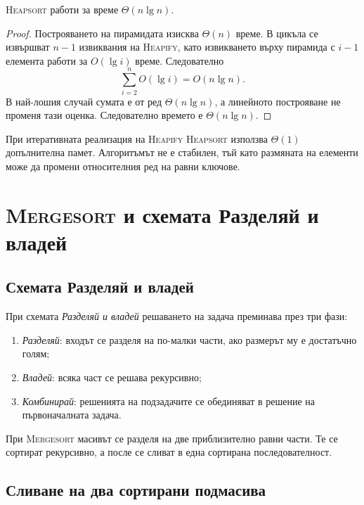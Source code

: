 \begin{thm}
\textsc{Heapsort} работи за време $\Theta(n\lg n)$.
\end{thm}

\begin{proof}
Построяването на пирамидата изисква $\Theta(n)$ време. В цикъла се извършват $n-1$ извиквания на \textsc{Heapify}, като извикването върху пирамида с $i-1$ елемента работи за $O(\lg i)$ време. Следователно
\[
\sum_{i=2}^{n} O(\lg i)=O(n\lg n).
\]
В най-лошия случай сумата е от ред $\Theta(n\lg n)$, а линейното построяване не променя тази оценка. Следователно времето е $\Theta(n\lg n)$.
\end{proof}

\begin{remark}
При итеративната реализация на \textsc{Heapify} \textsc{Heapsort} използва $\Theta(1)$ допълнителна памет. Алгоритъмът не е стабилен, тъй като размяната на елементи може да промени относителния ред на равни ключове.
\end{remark}

\section{\textsc{Mergesort} и схемата Разделяй и владей}\label{s:6.6}

\subsection{Схемата Разделяй и владей}\label{s:6.6.1}

При схемата \emph{Разделяй и владей} решаването на задача преминава през три фази:

\begin{enumerate}
    \item \emph{Разделяй}: входът се разделя на по-малки части, ако размерът му е достатъчно голям;
    \item \emph{Владей}: всяка част се решава рекурсивно;
    \item \emph{Комбинирай}: решенията на подзадачите се обединяват в решение на първоначалната задача.
\end{enumerate}

При \textsc{Mergesort} масивът се разделя на две приблизително равни части. Те се сортират рекурсивно, а после се сливат в една сортирана последователност.

\subsection{Сливане на два сортирани подмасива}\label{s:6.6.2}

